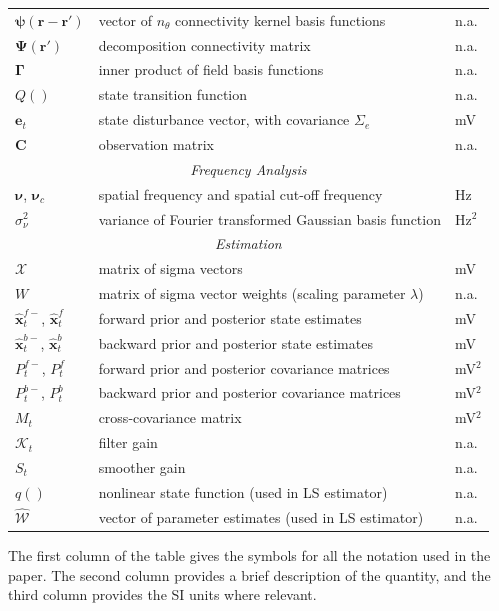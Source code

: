 \documentclass[12pt]{iopart}
\begin{document}
\begin{table}[!ht]
\begin{tabular}{|l|l|l|}
   	$\boldsymbol{\psi}(\mathbf{r}-\mathbf{r}')$ & vector of $n_{\theta}$ connectivity kernel basis functions & n.a.\\
   	$\boldsymbol{\Psi}(\mathbf{r}')$ & decomposition connectivity matrix & n.a.\\
   	$\boldsymbol{\Gamma}$ & inner product of field basis functions & n.a.\\
   	$Q()$ & state transition function & n.a.\\
   	$\mathbf{e}_t$ & state disturbance vector, with covariance $\Sigma_e$ & mV\\
   	$\mathbf{C}$ & observation matrix & n.a. \\
	\hline
	\multicolumn{3}{|c|}{\emph{Frequency Analysis}} \\
	\hline
	$\boldsymbol{\nu}$, $\boldsymbol{\nu}_c$ & spatial frequency and spatial cut-off frequency & Hz \\
	$\sigma_{\nu}^2$ & variance of Fourier transformed Gaussian basis function & Hz$^2$\\
	\hline
	\multicolumn{3}{|c|}{\emph{Estimation}} \\
	\hline
	$\mathcal{X}$ & matrix of sigma vectors & mV\\
	$W$ & matrix of sigma vector weights (scaling parameter $\lambda$) & n.a.\\
   	$\hat{\mathbf{x}}_t^{f-}$, $\hat{\mathbf{x}}_t^f$ & forward prior and posterior state estimates & mV\\
   	$\hat{\mathbf{x}}_t^{b-}$, $\hat{\mathbf{x}}_t^{b}$ & backward prior and posterior state estimates & mV\\
 	$P^{f-}_t$, $P^f_t$  & forward prior and posterior covariance matrices & mV$^2$\\
   	$P^{b-}_t$, $P^b_t$ & backward prior and posterior covariance matrices & mV$^2$\\
	$M_t$& cross-covariance matrix & mV$^2$\\
	$\mathcal K_{t} $ & filter gain & n.a.\\
	$S_t$ & smoother gain & n.a.\\
	$q()$ & nonlinear state function (used in LS estimator) & n.a.\\
   	$\mathcal{\hat{W}}$& vector of parameter estimates (used in LS estimator) & n.a.\\	
	\hline
\end{tabular}
\begin{flushleft}The first column of the table gives the symbols for all the notation used in the paper. The second column provides a brief description of the quantity, and the third column provides the SI units where relevant.
\end{flushleft}
\label{tab:Notation}
\end{table}
\end{document}
